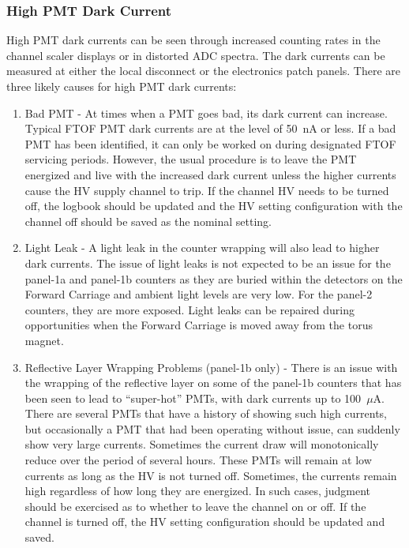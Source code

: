 \documentclass[12pt]{article}
\begin{document}
\subsubsection{High PMT Dark Current}
\label{high-current}

High PMT dark currents can be seen through increased counting rates in the channel scaler displays
or in distorted ADC spectra. The dark currents can be measured at either the local disconnect or 
the electronics patch panels. There are three likely causes for high PMT dark currents:

\begin{enumerate}
\item Bad PMT - At times when a PMT goes bad, its dark current can increase. Typical FTOF PMT dark 
currents are at the level of 50~nA or less. If a bad PMT has been identified, it can only be worked 
on during designated FTOF servicing periods. However, the usual procedure is to leave the PMT 
energized and live with the increased dark current unless the higher currents cause the HV supply 
channel to trip. If the channel HV needs to be turned off, the logbook should be updated and the HV 
setting configuration with the channel off should be saved as the nominal setting.
\item Light Leak - A light leak in the counter wrapping will also lead to higher dark currents. The 
issue of light leaks is not expected to be an issue for the panel-1a and panel-1b counters as they 
are buried within the detectors on the Forward Carriage and ambient light levels are very low. For 
the panel-2 counters, they are more exposed. Light leaks can be repaired during opportunities when 
the Forward Carriage is moved away from the torus magnet.
\item Reflective Layer Wrapping Problems (panel-1b only) - There is an issue with the wrapping of 
the reflective layer on some of the panel-1b counters that has been seen to lead to ``super-hot'' 
PMTs, with dark currents up to 100~$\mu$A. There are several PMTs that have a history of showing 
such high currents, but occasionally a PMT that had been operating without issue, can suddenly show 
very large currents. Sometimes the current draw will monotonically reduce over the period of several 
hours. These PMTs will remain at low currents as long as the HV is not turned off. Sometimes, the 
currents remain high regardless of how long they are energized. In such cases, judgment should be 
exercised as to whether to leave the channel on or off. If the channel is turned off, the HV 
setting configuration should be updated and saved.
\end{enumerate}
\end{document}
